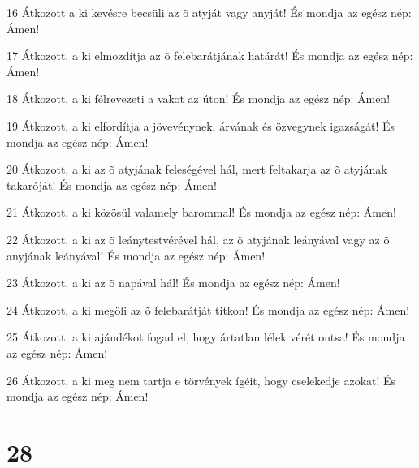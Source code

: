 \par 16 Átkozott a ki kevésre becsüli az õ atyját vagy anyját! És mondja az egész nép: Ámen!
\par 17 Átkozott, a ki elmozdítja az õ felebarátjának határát! És mondja az egész nép: Ámen!
\par 18 Átkozott, a ki félrevezeti a vakot az úton! És mondja az egész nép: Ámen!
\par 19 Átkozott, a ki elfordítja a jövevénynek, árvának és özvegynek igazságát! És mondja az egész nép: Ámen!
\par 20 Átkozott, a ki az õ atyjának feleségével hál, mert feltakarja az õ atyjának takaróját! És mondja az egész nép: Ámen!
\par 21 Átkozott, a ki közösül valamely barommal! És mondja az egész nép: Ámen!
\par 22 Átkozott, a ki az õ leánytestvérével hál, az õ atyjának leányával vagy az õ anyjának leányával! És mondja az egész nép: Ámen!
\par 23 Átkozott, a ki az õ napával hál! És mondja az egész nép: Ámen!
\par 24 Átkozott, a ki megöli az õ felebarátját titkon! És mondja az egész nép: Ámen!
\par 25 Átkozott, a ki ajándékot fogad el, hogy ártatlan lélek vérét ontsa! És mondja az egész nép: Ámen!
\par 26 Átkozott, a ki meg nem tartja e törvények ígéit, hogy cselekedje azokat! És mondja az egész nép: Ámen!

\chapter{28}

